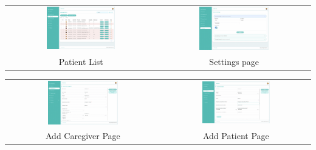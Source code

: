 \begin{center}
    \begin{tabular}{cc}
    \includegraphics[width=0.475\textwidth]{images/Chapter4/Evv/patient_list_mid.png} & \includegraphics[width=0.475\textwidth]{images/Chapter4/Evv/settings_mid.png} \\
    Patient List & Settings page \\
    \end{tabular}
\end{center}

\begin{center}
    \begin{tabular}{cc}
    \includegraphics[width=0.475\textwidth]{images/Chapter4/Evv/add_caregiver_mid.png} & \includegraphics[width=0.475\textwidth]{images/Chapter4/Evv/add_patient_mid.png} \\
    Add Caregiver Page & Add Patient Page \\
    \end{tabular}
\end{center}

